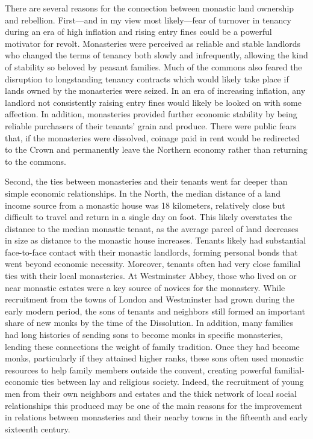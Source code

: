 \documentclass[12pt]{article}
\begin{document}
There are several reasons for the connection between monastic land ownership and rebellion. First---and in my view most likely---fear of turnover in tenancy during an era of high inflation and rising entry fines could be a powerful motivator for revolt.  Monasteries were perceived as reliable and stable landlords who changed the terms of tenancy both slowly and infrequently, allowing the kind of stability so beloved by peasant families.\autocite[113-4]{Clark2021} Much of the commons also feared the disruption to longstanding tenancy contracts which would likely take place if lands owned by the monasteries were seized.\autocite[276]{Bush1996} In an era of increasing inflation, any landlord not consistently raising entry fines would likely be looked on with some affection.\autocite[47]{Harrison1981} In addition, monasteries provided further economic stability by being reliable purchasers of their tenants' grain and produce. There were public fears that, if the monasteries were dissolved, coinage paid in rent would be redirected to the Crown and permanently leave the Northern economy rather than returning to the commons.\autocite[60]{Davies1968}

Second, the ties between monasteries and their tenants went far deeper than simple economic relationships. In the North, the median distance of a land income source from a monastic house was 18 kilometers, relatively close but difficult to travel and return in a single day on foot. This likely overstates the distance to the median monastic tenant, as the average parcel of land decreases in size as distance to the monastic house increases. Tenants likely had substantial face-to-face contact with their monastic landlords, forming personal bonds that went beyond economic necessity. Moreover, tenants often had very close familial ties with their local monasteries. At Westminster Abbey, those who lived on or near monastic estates were a key source of novices for the monastery. While recruitment from the towns of London and Westminster had grown during the early modern period, the sons of tenants and neighbors still formed an important share of new monks by the time of the Dissolution.\autocite[75-6]{Harvey1993} In addition, many families had long histories of sending sons to become monks in specific monasteries, lending these connections the weight of family tradition.\autocite[61]{Clark2021} Once they had become monks, particularly if they attained higher ranks, these sons often used monastic resources to help family members outside the convent, creating powerful familial-economic ties between lay and religious society.\autocite[64]{Clark2021} Indeed, the recruitment of young men from their own neighbors and estates and the thick network of local social relationships this produced may be one of the main reasons for the improvement in relations between monasteries and their nearby towns in the fifteenth and early sixteenth century.\autocite[278-9]{Clark2009}
\end{document}
